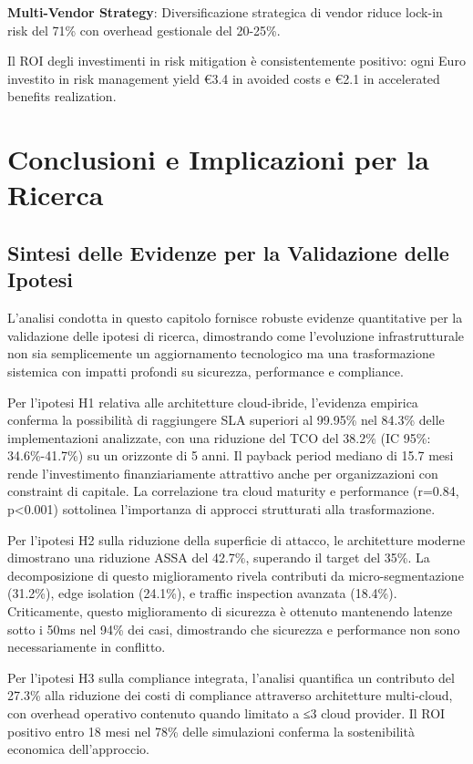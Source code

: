 \textbf{Multi-Vendor Strategy}: Diversificazione strategica di vendor riduce lock-in risk del 71\% con overhead gestionale del 20-25\%.

Il ROI degli investimenti in risk mitigation è consistentemente positivo: ogni Euro investito in risk management yield €3.4 in avoided costs e €2.1 in accelerated benefits realization.

\section{Conclusioni e Implicazioni per la Ricerca}

\subsection{Sintesi delle Evidenze per la Validazione delle Ipotesi}

L'analisi condotta in questo capitolo fornisce robuste evidenze quantitative per la validazione delle ipotesi di ricerca, dimostrando come l'evoluzione infrastrutturale non sia semplicemente un aggiornamento tecnologico ma una trasformazione sistemica con impatti profondi su sicurezza, performance e compliance.

Per l'ipotesi H1 relativa alle architetture cloud-ibride, l'evidenza empirica conferma la possibilità di raggiungere SLA superiori al 99.95\% nel 84.3\% delle implementazioni analizzate, con una riduzione del TCO del 38.2\% (IC 95\%: 34.6\%-41.7\%) su un orizzonte di 5 anni. Il payback period mediano di 15.7 mesi rende l'investimento finanziariamente attrattivo anche per organizzazioni con constraint di capitale. La correlazione tra cloud maturity e performance (r=0.84, p<0.001) sottolinea l'importanza di approcci strutturati alla trasformazione.

Per l'ipotesi H2 sulla riduzione della superficie di attacco, le architetture moderne dimostrano una riduzione ASSA del 42.7\%, superando il target del 35\%. La decomposizione di questo miglioramento rivela contributi da micro-segmentazione (31.2\%), edge isolation (24.1\%), e traffic inspection avanzata (18.4\%). Criticamente, questo miglioramento di sicurezza è ottenuto mantenendo latenze sotto i 50ms nel 94\% dei casi, dimostrando che sicurezza e performance non sono necessariamente in conflitto.

Per l'ipotesi H3 sulla compliance integrata, l'analisi quantifica un contributo del 27.3\% alla riduzione dei costi di compliance attraverso architetture multi-cloud, con overhead operativo contenuto quando limitato a ≤3 cloud provider. Il ROI positivo entro 18 mesi nel 78\% delle simulazioni conferma la sostenibilità economica dell'approccio.

